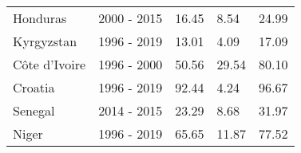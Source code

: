 \begin{table}[pos = H]
{{\begin{tabular}{lllll}
Honduras & 2000 - 2015 & 16.45 & 8.54 & 24.99\\
Kyrgyzstan & 1996 - 2019 & 13.01 & 4.09 & 17.09\\
\addlinespace
Côte d’Ivoire & 1996 - 2000 & 50.56 & 29.54 & 80.10\\
Croatia & 1996 - 2019 & 92.44 & 4.24 & 96.67\\
Senegal & 2014 - 2015 & 23.29 & 8.68 & 31.97\\
Niger & 1996 - 2019 & 65.65 & 11.87 & 77.52\\
\bottomrule 
\end{tabular}
}
}
\label{tbl-fgr_table}
\end{table}
